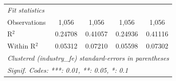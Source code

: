 \begin{tabular}{lcccc}
   \midrule
   \emph{Fit statistics}\\
   Observations                                               & 1,056                     & 1,056                           & 1,056                     & 1,056\\  
   R$^2$                                                      & 0.24708                   & 0.41057                         & 0.24936                   & 0.41116\\  
   Within R$^2$                                               & 0.05312                   & 0.07210                         & 0.05598                   & 0.07302\\  
   \midrule \midrule
   \multicolumn{5}{l}{\emph{Clustered (industry\_fe) standard-errors in parentheses}}\\
   \multicolumn{5}{l}{\emph{Signif. Codes: ***: 0.01, **: 0.05, *: 0.1}}\\
\end{tabular}
\par\endgroup

